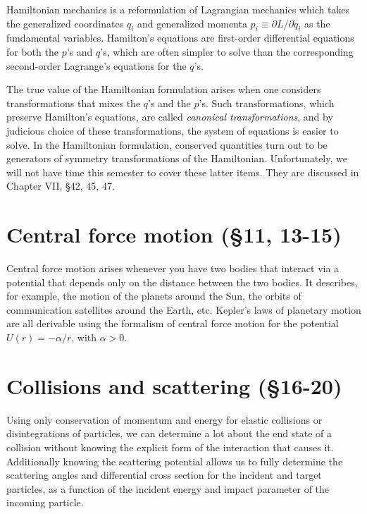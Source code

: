 \documentclass[10pt]{article}
\numberwithin{equation}{section}
\begin{document}
Hamiltonian mechanics is a reformulation of 
Lagrangian mechanics which takes the generalized
coordinates $q_i$ and generalized momenta 
$p_i\equiv \partial L/\partial \dot q_i$
as the fundamental variables.
Hamilton's equations are first-order differential
equations for both the $p$'s and $q$'s, which are 
often simpler to solve than the corresponding 
second-order Lagrange's equations for the $q$'s.

The true value of the Hamiltonian formulation arises 
when one considers transformations that mixes the 
$q$'s and the $p$'s.  
Such transformations, which preserve Hamilton's equations,
are called {\em canonical transformations},
and by judicious choice of these transformations, the 
system of equations is easier to solve.
In the Hamiltonian formulation, conserved quantities
turn out to be generators of symmetry transformations of
the Hamiltonian.
Unfortunately, we will not have time this semester to 
cover these latter items.
They are discussed in Chapter VII, \S 42, 45, 47.

\section{Central force motion (\S11, 13-15)}

Central force motion arises whenever you have 
two bodies that interact via a potential that depends
only on the distance between the two bodies.
It describes, for example, the motion of the planets 
around the Sun, the orbits of communication satellites 
around the Earth, etc.
Kepler's laws of planetary motion are all derivable
using the formalism of central force motion for the 
potential $U(r)= -\alpha/r$, with $\alpha>0$.

\section{Collisions and scattering (\S16-20)}

Using only conservation of momentum and energy 
for elastic collisions or disintegrations of 
particles, we can determine a lot about the 
end state of a collision without knowing the 
explicit form of the interaction that causes it.
Additionally knowing the scattering potential 
allows us to fully determine the 
scattering angles and differential cross section 
for the incident and target particles, as a function 
of the incident energy and impact parameter of 
the incoming particle.
\end{document}
